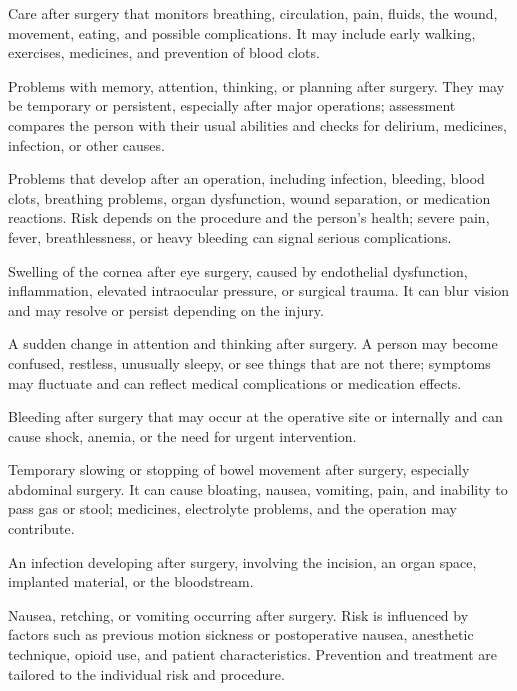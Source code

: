  Care after surgery that monitors breathing, circulation, pain, fluids, the wound, movement, eating, and possible complications. It may include early walking, exercises, medicines, and prevention of blood clots.

 Problems with memory, attention, thinking, or planning after surgery. They may be temporary or persistent, especially after major operations; assessment compares the person with their usual abilities and checks for delirium, medicines, infection, or other causes.

 Problems that develop after an operation, including infection, bleeding, blood clots, breathing problems, organ dysfunction, wound separation, or medication reactions. Risk depends on the procedure and the person's health; severe pain, fever, breathlessness, or heavy bleeding can signal serious complications.

 Swelling of the cornea after eye surgery, caused by endothelial dysfunction, inflammation, elevated intraocular pressure, or surgical trauma. It can blur vision and may resolve or persist depending on the injury.

 A sudden change in attention and thinking after surgery. A person may become confused, restless, unusually sleepy, or see things that are not there; symptoms may fluctuate and can reflect medical complications or medication effects.

 Bleeding after surgery that may occur at the operative site or internally and can cause shock, anemia, or the need for urgent intervention.

 Temporary slowing or stopping of bowel movement after surgery, especially abdominal surgery. It can cause bloating, nausea, vomiting, pain, and inability to pass gas or stool; medicines, electrolyte problems, and the operation may contribute.

 An infection developing after surgery, involving the incision, an organ space, implanted material, or the bloodstream.

 Nausea, retching, or vomiting occurring after surgery. Risk is influenced by factors
such as previous motion sickness or postoperative nausea, anesthetic technique, opioid
use, and patient characteristics. Prevention and treatment are tailored to the individual
risk and procedure.

